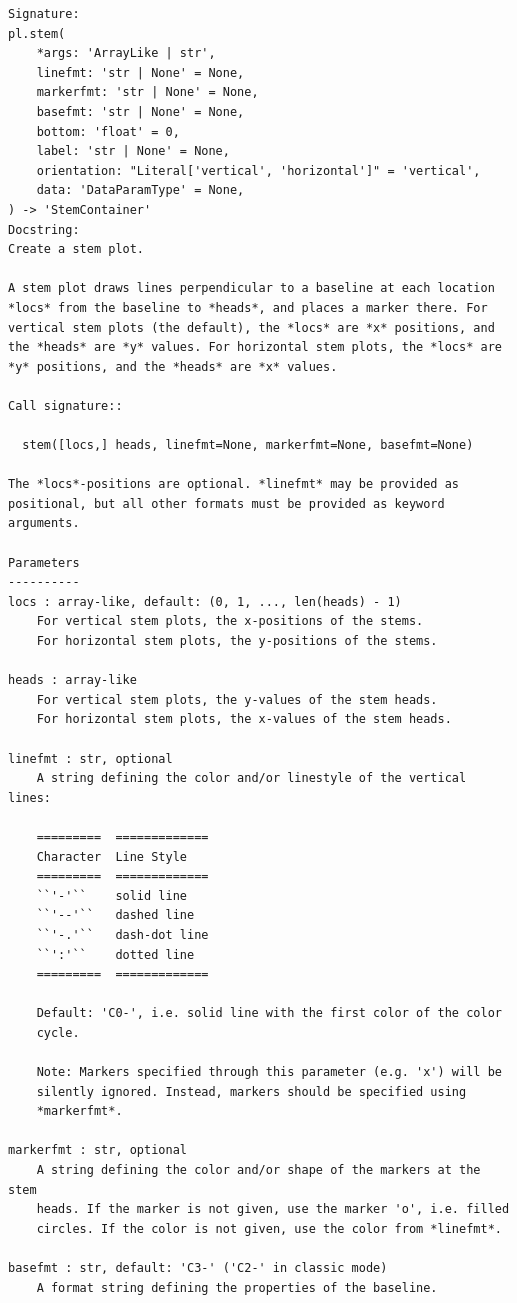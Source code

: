 \documentclass[
  letterpaper,
  DIV=11,
  numbers=noendperiod]{scrreprt}
\begin{document}
\begin{verbatim}
Signature:
pl.stem(
    *args: 'ArrayLike | str',
    linefmt: 'str | None' = None,
    markerfmt: 'str | None' = None,
    basefmt: 'str | None' = None,
    bottom: 'float' = 0,
    label: 'str | None' = None,
    orientation: "Literal['vertical', 'horizontal']" = 'vertical',
    data: 'DataParamType' = None,
) -> 'StemContainer'
Docstring:
Create a stem plot.

A stem plot draws lines perpendicular to a baseline at each location
*locs* from the baseline to *heads*, and places a marker there. For
vertical stem plots (the default), the *locs* are *x* positions, and
the *heads* are *y* values. For horizontal stem plots, the *locs* are
*y* positions, and the *heads* are *x* values.

Call signature::

  stem([locs,] heads, linefmt=None, markerfmt=None, basefmt=None)

The *locs*-positions are optional. *linefmt* may be provided as
positional, but all other formats must be provided as keyword
arguments.

Parameters
----------
locs : array-like, default: (0, 1, ..., len(heads) - 1)
    For vertical stem plots, the x-positions of the stems.
    For horizontal stem plots, the y-positions of the stems.

heads : array-like
    For vertical stem plots, the y-values of the stem heads.
    For horizontal stem plots, the x-values of the stem heads.

linefmt : str, optional
    A string defining the color and/or linestyle of the vertical lines:

    =========  =============
    Character  Line Style
    =========  =============
    ``'-'``    solid line
    ``'--'``   dashed line
    ``'-.'``   dash-dot line
    ``':'``    dotted line
    =========  =============

    Default: 'C0-', i.e. solid line with the first color of the color
    cycle.

    Note: Markers specified through this parameter (e.g. 'x') will be
    silently ignored. Instead, markers should be specified using
    *markerfmt*.

markerfmt : str, optional
    A string defining the color and/or shape of the markers at the stem
    heads. If the marker is not given, use the marker 'o', i.e. filled
    circles. If the color is not given, use the color from *linefmt*.

basefmt : str, default: 'C3-' ('C2-' in classic mode)
    A format string defining the properties of the baseline.


\end{verbatim}
\end{document}
